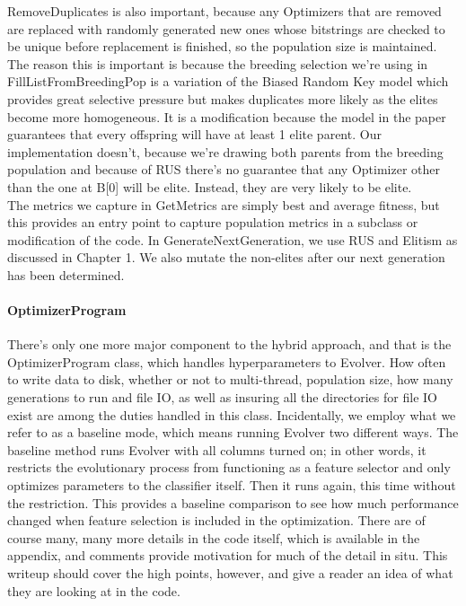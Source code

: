 RemoveDuplicates is also important, because any Optimizers that are removed are replaced with randomly generated new ones whose bitstrings are checked to be unique before replacement is finished, so the population size is maintained.  The reason this is important is because the breeding selection we're using in FillListFromBreedingPop is a variation of the Biased Random Key model \citep{ruiz_biased_2015} which provides great selective pressure but makes duplicates more likely as the elites become more homogeneous.  It is a modification because the model in the paper guarantees that every offspring will have at least 1 elite parent.  Our implementation doesn't, because we're drawing both parents from the breeding population and because of RUS there's no guarantee that any Optimizer other than the one at B[0] will be elite.  Instead, they are very likely to be elite.\\
The metrics we capture in GetMetrics are simply best and average fitness, but this provides an entry point to capture population metrics in a subclass or modification of the code.  In GenerateNextGeneration, we use RUS and Elitism as discussed in Chapter 1.  We also mutate the non-elites after our next generation has been determined.
\paragraph{OptimizerProgram}
There's only one more major component to the hybrid approach, and that is the OptimizerProgram class, which handles hyperparameters to Evolver.  How often to write data to disk, whether or not to multi-thread, population size, how many generations to run and file IO, as well as insuring all the directories for file IO exist are among the duties handled in this class.  Incidentally, we employ what we refer to as a baseline mode, which means running Evolver two different ways.  The baseline method runs Evolver with all columns turned on; in other words, it restricts the evolutionary process from functioning as a feature selector and only optimizes parameters to the classifier itself.  Then it runs again, this time without the restriction.  This provides a baseline comparison to see how much performance changed when feature selection is included in the optimization.
There are of course many, many more details in the code itself, which is available in the appendix, and comments provide motivation for much of the detail in situ.  This writeup should cover the high points, however, and give a reader an idea of what they are looking at in the code.
